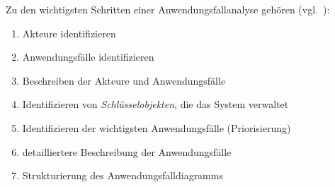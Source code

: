 \begin{tcolorbox}
    Zu den wichtigsten Schritten einer Anwendungsfallanalyse gehören (vgl.~\cite[Aufgabe 5.2, 88]{Buh09}):
    \begin{enumerate}
        \item Akteure identifizieren
        \item Anwendungsfälle identifizieren
        \item Beschreiben der Akteure und Anwendungsfälle
        \item Identifizieren von \textit{Schlüsselobjekten}, die das System verwaltet
        \item Identifizieren der wichtigsten Anwendungsfälle (Priorisierung)
        \item detailliertere Beschreibung der Anwendungsfälle
        \item Strukturierung des Anwendungsfalldiagramms
    \end{enumerate}
\end{tcolorbox}

